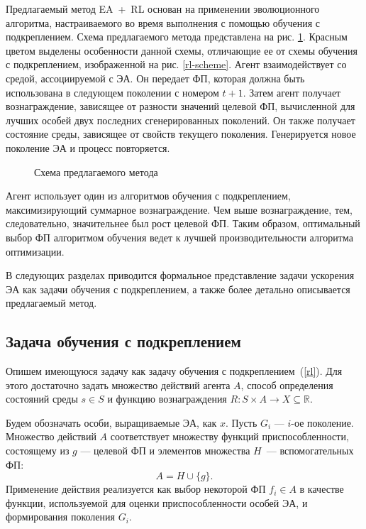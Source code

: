 Предлагаемый метод EA~+~RL основан на применении эволюционного алгоритма, настраиваемого во время выполнения с помощью обучения с подкреплением. Схема предлагаемого метода представлена на рис. \ref{ea-rl-scheme}. Красным цветом выделены особенности данной схемы, отличающие ее от схемы обучения с подкреплением, изображенной на рис. \ref{rl-scheme}. Агент взаимодействует со средой, ассоциируемой с ЭА. Он передает ФП, которая должна быть использована в следующем поколении с номером $t + 1$. Затем агент получает вознаграждение, зависящее от разности значений целевой ФП, вычисленной для лучших особей двух последних сгенерированных поколений. Он также получает состояние среды, зависящее от свойств текущего поколения. Генерируется новое поколение ЭА и процесс повторяется.

\begin{figure}[h!]
	\caption{Схема предлагаемого метода}
	\label{ea-rl-scheme}
\end{figure}

Агент использует один из алгоритмов обучения с подкреплением, максимизирующий суммарное вознаграждение. Чем выше вознаграждение, тем, следовательно, значительнее был рост целевой ФП. Таким образом, оптимальный выбор ФП алгоритмом обучения ведет к лучшей производительности алгоритма оптимизации.

В следующих разделах приводится формальное представление задачи ускорения ЭА как задачи обучения с подкреплением, а также более детально описывается предлагаемый метод.

\subsection{Задача обучения с подкреплением}

Опишем имеющуюся задачу как задачу обучения с подкреплением~(\ref{rl}). Для этого достаточно задать множество действий агента $A$, способ определения состояний среды $s \in S$ и функцию вознаграждения $R : S \times A \rightarrow X \subseteq \mathbb{R}$. 

Будем обозначать особи, выращиваемые ЭА, как $x$. Пусть $G_i$ --- $i$-ое поколение. Множество действий $A$ соответствует множеству функций приспособленности, состоящему из $g$ --- целевой ФП и элементов множества $H$~--- вспомогательных ФП:
\begin{equation}\label{act}A = H \cup \{g\}.\end{equation}
Применение действия реализуется как выбор некоторой ФП $f_i \in A$ в качестве функции, используемой для оценки приспособленности особей ЭА, и формирования поколения $G_i$.


